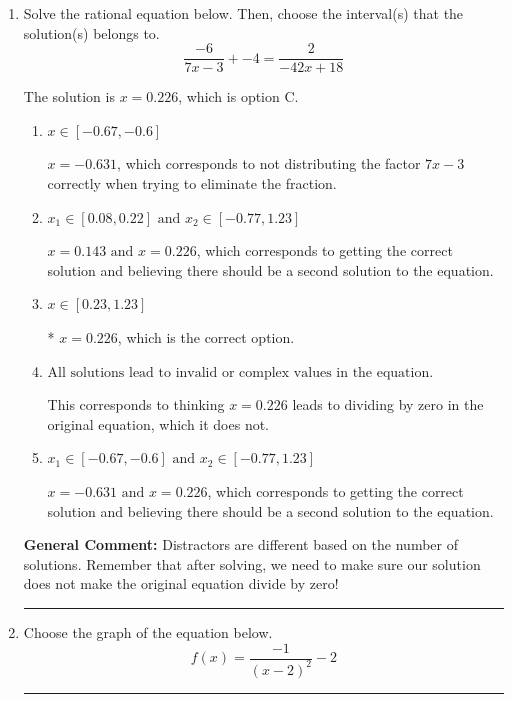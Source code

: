 \documentclass{extbook}[14pt]
\newcommand{\litem}[1]{\item #1

\rule{\textwidth}{0.4pt}}
\begin{document}
\begin{enumerate}\litem{
Solve the rational equation below. Then, choose the interval(s) that the solution(s) belongs to.
\[ \frac{-6}{7x -3} + -4 = \frac{2}{-42x + 18} \]

The solution is \( x = 0.226 \), which is option C.\begin{enumerate}[label=\Alph*.]
\item \( x \in [-0.67,-0.6] \)

$x = -0.631$, which corresponds to not distributing the factor $7x -3$ correctly when trying to eliminate the fraction.
\item \( x_1 \in [0.08, 0.22] \text{ and } x_2 \in [-0.77,1.23] \)

$x = 0.143 \text{ and } x = 0.226$, which corresponds to getting the correct solution and believing there should be a second solution to the equation.
\item \( x \in [0.23,1.23] \)

* $x = 0.226$, which is the correct option.
\item \( \text{All solutions lead to invalid or complex values in the equation.} \)

This corresponds to thinking $x = 0.226$ leads to dividing by zero in the original equation, which it does not.
\item \( x_1 \in [-0.67, -0.6] \text{ and } x_2 \in [-0.77,1.23] \)

$x = -0.631 \text{ and } x = 0.226$, which corresponds to getting the correct solution and believing there should be a second solution to the equation.
\end{enumerate}

\textbf{General Comment:} Distractors are different based on the number of solutions. Remember that after solving, we need to make sure our solution does not make the original equation divide by zero!
}
\litem{
Choose the graph of the equation below.
\[ f(x) = \frac{-1}{(x - 2)^2} - 2 \]

}
\end{enumerate}
\end{document}

